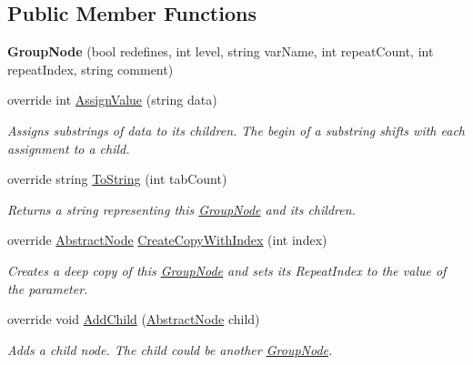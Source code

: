 \subsection*{Public Member Functions}
\begin{DoxyCompactItemize}
\item 
{\bfseries Group\+Node} (bool redefines, int level, string var\+Name, int repeat\+Count, int repeat\+Index, string comment)\hypertarget{class__1920_parser_1_1_group_node_a53519a72e3f5194de29b77e51f5df939}{}\label{class__1920_parser_1_1_group_node_a53519a72e3f5194de29b77e51f5df939}

\item 
override int \hyperlink{class__1920_parser_1_1_group_node_a27b61720154a26499149966cf22de811}{Assign\+Value} (string data)
\begin{DoxyCompactList}\small\item\em Assigns substrings of data to its children. The begin of a substring shifts with each assignment to a child. \end{DoxyCompactList}\item 
override string \hyperlink{class__1920_parser_1_1_group_node_a9d5c05eabdd12c9c4ca306cc369d8523}{To\+String} (int tab\+Count)
\begin{DoxyCompactList}\small\item\em Returns a string representing this \hyperlink{class__1920_parser_1_1_group_node}{Group\+Node} and its children. \end{DoxyCompactList}\item 
override \hyperlink{class__1920_parser_1_1_abstract_node}{Abstract\+Node} \hyperlink{class__1920_parser_1_1_group_node_ab01b00a2bbbef1d565e5ef3e951c4ed6}{Create\+Copy\+With\+Index} (int index)
\begin{DoxyCompactList}\small\item\em Creates a deep copy of this \hyperlink{class__1920_parser_1_1_group_node}{Group\+Node} and sets its Repeat\+Index to the value of the parameter. \end{DoxyCompactList}\item 
override void \hyperlink{class__1920_parser_1_1_group_node_a037839ecea0ec7326c6a49e0793bd6c8}{Add\+Child} (\hyperlink{class__1920_parser_1_1_abstract_node}{Abstract\+Node} child)
\begin{DoxyCompactList}\small\item\em Adds a child node. The child could be another \hyperlink{class__1920_parser_1_1_group_node}{Group\+Node}. \end{DoxyCompactList}\item 

\end{DoxyCompactItemize}
